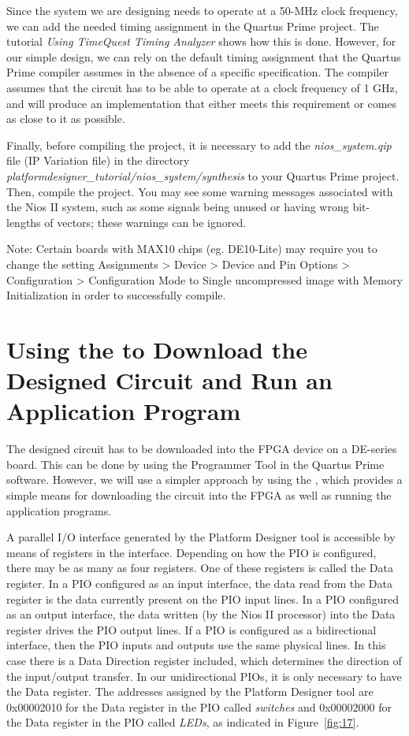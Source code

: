 \documentclass[11pt, twoside, pdftex]{article}
\begin{document}
Since the system we are designing needs to operate at a 50-MHz clock
frequency, we can add the needed timing assignment in the Quartus Prime project.
The tutorial {\it Using TimeQuest Timing Analyzer} shows how this is done.
However, for our simple design, we can rely on the default timing assignment that the Quartus Prime
compiler assumes in the absence of a specific specification. The compiler assumes that the circuit
has to be able to operate at a clock frequency of 1 GHz, and will produce an implementation
that either meets this requirement or comes as close to it as possible.

Finally, before compiling the project, it is necessary to add the {\it nios\_system.qip}
file (IP Variation file) in the directory 
{\it platformdesigner\_tutorial/nios\_system/synthesis} to your Quartus Prime project.
Then, compile the project.
You may see some warning messages associated with
the Nios II system, such as some signals being unused or having wrong bit-lengths of vectors; 
these warnings can be ignored.

Note: Certain boards with MAX10 chips (eg. DE10-Lite) may require you to change the setting
{\sf Assignments > Device > Device and Pin Options > Configuration > Configuration Mode} to 
{\sf Single uncompressed image with Memory Initialization} in order to successfully compile.

\section{Using the \productNameMed{} to Download the Designed Circuit and Run an Application Program}

The designed circuit has to be downloaded into the FPGA device on a DE-series board. 
This can be done by using the Programmer Tool in the Quartus Prime software. 
However, we will use a simpler approach by using the \productNameMed{}, 
which provides a simple means for downloading
the circuit into the FPGA as well as running the application programs.

A parallel I/O interface generated by the Platform Designer tool is accessible by means of registers
in the interface. Depending on how the PIO is configured, there may be as many as
four registers. One of these registers is called the Data register. 
In a PIO configured as an input interface, the data read from the Data register is
the data currently present on the PIO input lines.
In a PIO configured as an output interface, the data written (by the Nios II processor)
into the Data register drives the PIO output lines.
If a PIO is configured as a bidirectional interface, then the PIO inputs and outputs
use the same physical lines. In this case there is a Data Direction register included,
which determines the direction of the input/output transfer.
In our unidirectional PIOs, it is only necessary to have the Data register.
The addresses assigned by the Platform Designer tool are 0x00002010 for the Data register in
the PIO called {\it switches} and 0x00002000 for the Data register in the PIO called {\it LEDs},
as indicated in Figure~\ref{fig:17}.
\end{document}
